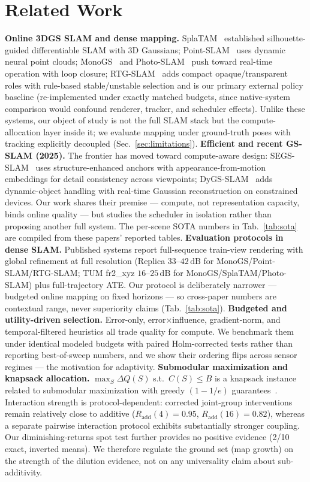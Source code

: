 \documentclass[10pt,twocolumn,letterpaper]{article}
\begin{document}
\section{Related Work}
\textbf{Online 3DGS SLAM and dense mapping.}
SplaTAM~\cite{keetha2023splatam} established silhouette-guided differentiable SLAM with 3D Gaussians; Point-SLAM~\cite{sandstrom2023pointslam} uses dynamic neural point clouds; MonoGS~\cite{matsuki2024gaussian} and Photo-SLAM~\cite{huang2024photoslam} push toward real-time operation with loop closure; RTG-SLAM~\cite{peng2024rtgslam} adds compact opaque/transparent roles with rule-based stable/unstable selection and is our primary external policy baseline (re-implemented under exactly matched budgets, since native-system comparison would confound renderer, tracker, and scheduler effects).
Unlike these systems, our object of study is not the full SLAM stack but the compute-allocation layer inside it; we evaluate mapping under ground-truth poses with tracking explicitly decoupled (Sec.~\ref{sec:limitations}).
\textbf{Efficient and recent GS-SLAM (2025).}
The frontier has moved toward compute-aware design: SEGS-SLAM~\cite{wen2025segs} uses structure-enhanced anchors with appearance-from-motion embeddings for detail consistency across viewpoints; DyGS-SLAM~\cite{hu2025dygs} adds dynamic-object handling with real-time Gaussian reconstruction on constrained devices.
Our work shares their premise --- compute, not representation capacity, binds online quality --- but studies the scheduler in isolation rather than proposing another full system.
The per-scene SOTA numbers in Tab.~\ref{tab:sota} are compiled from these papers' reported tables.
\textbf{Evaluation protocols in dense SLAM.}
Published systems report full-sequence train-view rendering with global refinement at full resolution (Replica $33$--$42\,\mathrm{dB}$ for MonoGS/Point-SLAM/RTG-SLAM; TUM fr2\_xyz $16$--$25\,\mathrm{dB}$ for MonoGS/SplaTAM/Photo-SLAM) plus full-trajectory ATE. Our protocol is deliberately narrower --- budgeted online mapping on fixed horizons --- so cross-paper numbers are contextual range, never superiority claims (Tab.~\ref{tab:sota}).
\textbf{Budgeted and utility-driven selection.}
Error-only, error$\times$influence, gradient-norm, and temporal-filtered heuristics all trade quality for compute.
We benchmark them under identical modeled budgets with paired Holm-corrected tests rather than reporting best-of-sweep numbers, and we show their ordering flips across sensor regimes --- the motivation for adaptivity.
\textbf{Submodular maximization and knapsack allocation.}
$\max_S \Delta Q(S)$ s.t.\ $C(S) \le B$ is a knapsack instance related to submodular maximization with greedy $(1-1/e)$ guarantees~\cite{nemhauser1978analysis}.
Interaction strength is protocol-dependent: corrected joint-group interventions remain relatively close to additive ($R_{\mathrm{add}}(4) = 0.95$, $R_{\mathrm{add}}(16) = 0.82$), whereas a separate pairwise interaction protocol exhibits substantially stronger coupling. Our diminishing-returns spot test further provides no positive evidence (2/10 exact, inverted means). We therefore regulate the ground set (map growth) on the strength of the dilution evidence, not on any universality claim about sub-additivity.
\end{document}
